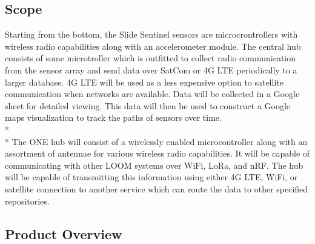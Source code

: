 \documentclass[onecolumn, draftclsnofoot,10pt, compsoc]{IEEEtran}
\begin{document}
\subsection{Scope}
Starting from the bottom, the Slide Sentinel sensors are microcrontrollers with wireless radio capabilities along with an accelerometer module.
The central hub consists of some microtroller which is outfitted to collect radio communication from the sensor array and send data over SatCom or 4G LTE periodically to a larger database. 4G LTE will be used as a less expensive option to satellite communication when networks are available. Data will be collected in a Google sheet for detailed viewing. This data will then be used to construct a Google maps visualization to track the paths of sensors over time.
\\* \\*
The ONE hub will consist of a wirelessly enabled microcontroller along with an assortment of antennae for various wireless radio capabilities. It will be capable of communicating with other LOOM systems over WiFi, LoRa, and nRF. The hub will be capable of transmitting this information using either 4G LTE, WiFi, or satellite connection to another service which can route the data to other specified repositories.


\subsection{Product Overview}
\end{document}
